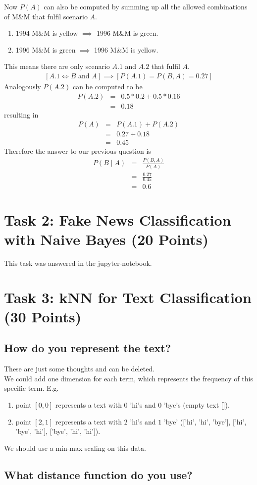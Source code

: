 \documentclass{article}
\begin{document}
	Now $P(A)$ can also be computed by summing up all the allowed combinations of M\&M that fulfil scenario $A$.\\
	\begin{enumerate}[label=A.\arabic*]
		\item 1994 M\&M is yellow $\implies$ 1996 M\&M is green.
		\item 1996 M\&M is green $\implies$ 1996 M\&M is yellow.
	\end{enumerate}
	This means there are only scenario $A.1$ and $A.2$ that fulfil $A$.
	\begin{eqnarray*}
		\left[A.1 \Leftrightarrow B \text{ and } A\right] \implies \left[P(A.1) = P(B, A) = 0.27\right]
	\end{eqnarray*}
	Analogously $P(A.2)$ can be computed to be
	\begin{eqnarray*}
		P(A.2) &=& 0.5 * 0.2 + 0.5 * 0.16\\
		&=& 0.18
	\end{eqnarray*}
	resulting in
	\begin{eqnarray*}
		P(A) &=& P(A.1) + P(A.2)\\
		&=& 0.27 + 0.18\\
		&=& 0.45
	\end{eqnarray*}
	Therefore the answer to our previous question is
	\begin{eqnarray*}
		P(B \mid A) &=& \frac{P(B, A)}{P(A)}\\
		&=& \frac{0.27}{0.45}\\
		&=& 0.6
	\end{eqnarray*}
\section{Task 2: Fake News Classification with Naive Bayes (20 Points)}
	This task was answered in the jupyter-notebook.
\section{Task 3: kNN for Text Classification (30 Points)}
	\subsection{How do you represent the text?}
	These are just some thoughts and can be deleted.\\
	We could add one dimension for each term, which represents the frequency of this specific term. E.g.
	\begin{enumerate}[label=-]
		\item point $[0, 0]$ represents a text with $0$ 'hi's and $0$ 'bye's (empty text []).
		\item point $[2, 1]$ represents a text with $2$ 'hi's and $1$ 'bye' (['hi', 'hi', 'bye'], ['hi', 'bye', 'hi'], ['bye', 'hi', 'hi']).
	\end{enumerate}
	We should use a min-max scaling on this data.
	\subsection{What distance function do you use?}
\end{document}
